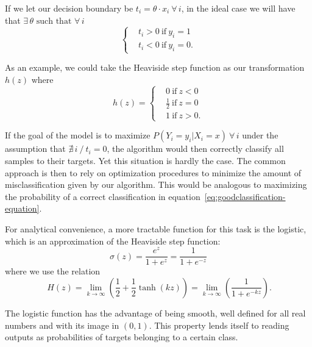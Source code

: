 If we let our decision boundary be $ t_i = \theta \cdot x_i \ \forall \, i $, in the ideal case we will have that $\exists \, \theta \mbox{ such that } \forall \, i $
\begin{equation}
\begin{cases}
& t_i >0 \ \mbox{if} \ y_i=1 \\
& t_i <0 \ \mbox{if} \ y_i=0.
\end{cases}
\end{equation}

As an example, we could take the Heaviside step function as our transformation $h(z)$ where
\begin{equation}
h(z) =
\begin{cases}
&0 \ \mbox{if} \ z<0 \\
&\frac{1}{2} \ \mbox{if} \ z=0 \\
&1 \ \mbox{if} \ z>0.
\end{cases}
\end{equation}

If the goal of the model is to maximize $P(Y_i = y_i | X_i = x) \ \forall \, i$
under the assumption that $\nexists\, i \ / \ t_i = 0$, the algorithm would then correctly classify all samples to their targets. Yet this situation is hardly the case. The common approach is then to rely on optimization procedures to minimize the amount of misclassification given by our algorithm. This would be analogous to maximizing the probability of a correct classification in equation~\eqref{eq:goodclassification-equation}.


For analytical convenience, a more tractable function for this task is the logistic, which is an approximation of the Heaviside step function:
\begin{equation}\label{eq:logisticFunction}
\sigma(z) = \frac{e^{z}}{1 + e^{z}} = \frac{1}{1 + e^{-z}}
\end{equation}
where we use the relation
\begin{equation}
 \ H(z) = \lim_{k \to \infty} \left(\frac{1}{2} + \frac{1}{2}\tanh(kz) \right) = \lim_{k \to \infty} \left(\frac{1}{1+e^{-kz}} \right) .
\end{equation}

The logistic function has the advantage of being smooth, well defined for all real numbers and with its image in $(0,1)$. This property lends itself to reading outputs as probabilities of targets belonging to a certain class.

